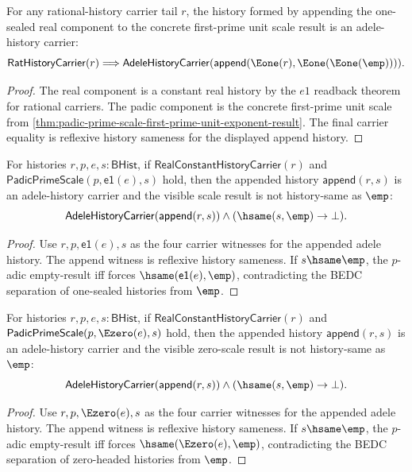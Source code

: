 \begin{theorem}
\label{thm:adele-history-carrier-first-prime-unit-scale}
For any rational-history carrier tail \(r\), the history formed by appending
the one-sealed real component to the concrete first-prime unit scale result is
an adele-history carrier:
$$
\mathsf{RatHistoryCarrier}(r)\Longrightarrow
\mathsf{AdeleHistoryCarrier}(
  \mathsf{append}(\Eone(r),\Eone(\Eone(\emp)))).
$$
\end{theorem}
\begin{proof}
The real component is a constant real history by the \(e1\) readback theorem
for rational carriers. The padic component is the concrete first-prime unit
scale from \autoref{thm:padic-prime-scale-first-prime-unit-exponent-result}.
The final carrier equality is reflexive history sameness for the displayed
append history.
\end{proof}

\begin{theorem}
\label{thm:adele-history-carrier-visible-scale-result-nonempty}
For histories $r,p,e,s:\mathsf{BHist}$, if
$\mathsf{RealConstantHistoryCarrier}(r)$ and
$\mathsf{PadicPrimeScale}(p,\mathsf{e1}(e),s)$ hold, then the appended history
$\mathsf{append}(r,s)$ is an adele-history carrier and the visible scale result
is not history-same as $\emp$:
$$
\mathsf{AdeleHistoryCarrier}(\mathsf{append}(r,s))\land
(\hsame(s,\emp)\to\bot).
$$
\end{theorem}
\begin{proof}
Use $r,p,\mathsf{e1}(e),s$ as the four carrier witnesses for the appended
adele history. The append witness is reflexive history sameness. If
$s\hsame\emp$, the $p$-adic empty-result iff forces
$\hsame(\mathsf{e1}(e),\emp)$, contradicting the BEDC separation of
one-sealed histories from $\emp$.
\end{proof}

\begin{theorem}
\label{thm:adele-history-carrier-visible-zero-scale-result-nonempty}
For histories $r,p,e,s:\mathsf{BHist}$, if
$\mathsf{RealConstantHistoryCarrier}(r)$ and
$\mathsf{PadicPrimeScale}(p,\Ezero(e),s)$ hold, then the appended history
$\mathsf{append}(r,s)$ is an adele-history carrier and the visible zero-scale
result is not history-same as $\emp$:
$$
\mathsf{AdeleHistoryCarrier}(\mathsf{append}(r,s))\land
(\hsame(s,\emp)\to\bot).
$$
\end{theorem}
\begin{proof}
Use $r,p,\Ezero(e),s$ as the four carrier witnesses for the appended adele
history. The append witness is reflexive history sameness. If $s\hsame\emp$,
the $p$-adic empty-result iff forces $\hsame(\Ezero(e),\emp)$, contradicting
the BEDC separation of zero-headed histories from $\emp$.
\end{proof}


